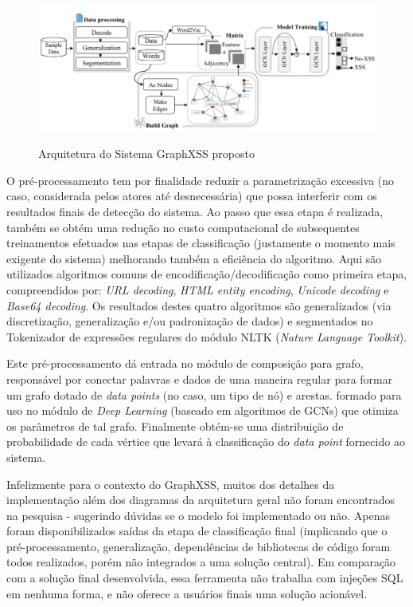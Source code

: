 \begin{figure}[ht]
    \centering
    \caption{Arquitetura do Sistema GraphXSS proposto}
    \includegraphics[width=14cm]{figuras/graphXSS.png} 
    \label{fig:internet} 
\end{figure}

O pré-processamento tem por finalidade reduzir a parametrização excessiva (no caso, considerada pelos atores até desnecessária) que possa interferir com os resultados finais de detecção do sistema. Ao passo que essa etapa é realizada, também se obtém uma redução no custo computacional de subsequentes treinamentos  efetuados nas etapas de classificação (justamente o momento mais exigente do sistema) melhorando também a eficiência do algoritmo. Aqui são utilizados algoritmos comuns de encodificação/decodificação como primeira etapa, compreendidos por: \textit{URL decoding}, \textit{HTML entity encoding}, \textit{Unicode decoding }e \textit{Base64 decoding}. Os resultados destes quatro algoritmos são generalizados (via discretização, generalização e/ou padronização de dados) e segmentados no Tokenizador de expressões regulares do módulo NLTK (\textit{Nature Language Toolkit}).

Este pré-processamento dá entrada no módulo de composição para grafo, responsável por conectar palavras e dados de uma maneira regular para formar um grafo dotado de \textit{data points} (no caso, um tipo de nó) e arestas. formado para uso no módulo de \textit{Deep Learning} (baseado em algoritmos de GCNs) que otimiza os parâmetros de tal grafo. Finalmente obtém-se uma distribuição de probabilidade de cada vértice que levará à classificação do \textit{data point} fornecido ao sistema. 

Infelizmente para o contexto do GraphXSS, muitos dos detalhes da implementação além dos diagramas da arquitetura geral não foram encontrados na pesquisa - sugerindo dúvidas se o modelo foi implementado ou não. Apenas foram disponibilizados saídas da etapa de classificação final (implicando que o pré-processamento, generalização, dependências de bibliotecas de código foram todos realizados, porém não integrados a uma solução central). Em comparação com a solução final desenvolvida, essa ferramenta não trabalha com injeções SQL em nenhuma forma, e não oferece a usuários finais uma solução acionável.

